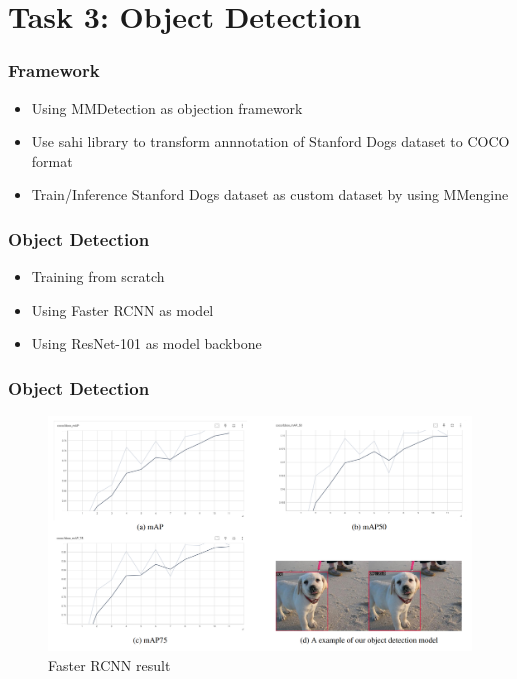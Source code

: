 \documentclass{beamer}
\begin{document}
    \section{Task 3: Object Detection}
        \begin{frame}
            \frametitle{Framework}
            \begin{itemize}
                \item Using MMDetection as objection framework
                \item Use sahi library to transform annnotation of Stanford Dogs dataset to COCO format
                \item Train/Inference Stanford Dogs dataset as custom dataset by using MMengine
            \end{itemize}
        \end{frame}
        \begin{frame}
            \frametitle{Object Detection}
            \begin{itemize}
                \item Training from scratch
                \item Using Faster RCNN as model
                \item Using ResNet-101 as model backbone
            \end{itemize}
        \end{frame}
        \begin{frame}
            \frametitle{Object Detection}
            \begin{figure}[H]
                \centering
                \includegraphics[width=12cm]{./img/pic1.png}
                \caption{Faster RCNN result}
            \end{figure}\par
        \end{frame}
\end{document}
